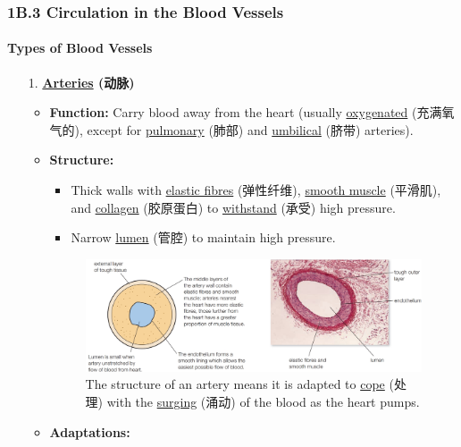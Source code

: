 
\subsubsection{1B.3 Circulation in the Blood Vessels}
\paragraph{Types of Blood Vessels}
\begin{itemize}
    \item[1.] \textbf{\underline{Arteries} (动脉)}
    \begin{itemize}
        \item \textbf{Function:} Carry blood away from the heart (usually \underline{oxygenated} (充满氧气的), except for
        \underline{pulmonary} (肺部) and \underline{umbilical} (脐带) arteries).
        \item \textbf{Structure:}
        \begin{itemize}
            \item Thick walls with \underline{elastic fibres} (弹性纤维), \underline{smooth muscle} (平滑肌), and
            \underline{collagen} (胶原蛋白) to \underline{withstand} (承受) high pressure.
            \item Narrow \underline{lumen} (管腔) to maintain high pressure.
        \end{itemize}
        \begin{figure}[H]
            \centering
            \includegraphics[scale=0.2]{Biology/1B/Images/1B-3-1.png}
            \caption{The structure of an artery means it is adapted to \underline{cope} (处理) with the \underline{surging} (涌动)
            of the blood as the heart pumps.}
        \end{figure}
        \item \textbf{Adaptations:}
        \begin{itemize}

\end{itemize}
\end{itemize}
\end{itemize}
